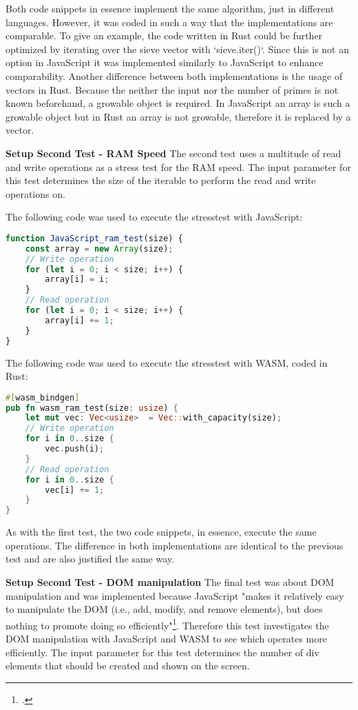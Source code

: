 Both code snippets in essence implement the same algorithm, just in different languages. However, it was coded in such a way that the implementations are comparable. To give an example, the code written in Rust could be further optimized by iterating over the sieve vector with `sieve.iter()`. Since this is not an option in JavaScript it was implemented similarly to JavaScript to enhance comparability. Another difference between both implementations is the usage of vectors in Rust. Because the neither the input nor the number of primes is not known beforehand, a growable object is required. In JavaScript an array is such a growable object but in Rust an array is not growable, therefore it is replaced by a vector. 

\textbf{Setup Second Test - RAM Speed} \newline
The second test uses a multitude of read and write operations as a stress test for the RAM speed. The input parameter for this test determines the size of the iterable to perform the read and write operations on.

The following code was used to execute the stresstest with JavaScript:
\begin{lstlisting}[language=JavaScript, caption={RAM stresstest in JavaScript, source: self-coded}]
function JavaScript_ram_test(size) {
    const array = new Array(size);
    // Write operation
    for (let i = 0; i < size; i++) {
        array[i] = i;
    }
    // Read operation
    for (let i = 0; i < size; i++) {
        array[i] += 1;
    }
}
\end{lstlisting}

The following code was used to execute the stresstest with WASM, coded in Rust:
\begin{lstlisting}[language=Rust, caption={RAM stresstest in Rust, source: self-coded}]
#[wasm_bindgen]
pub fn wasm_ram_test(size: usize) {
    let mut vec: Vec<usize>  = Vec::with_capacity(size);
    // Write operation
    for i in 0..size {
        vec.push(i);
    }
    // Read operation
    for i in 0..size {
        vec[i] += 1;
    }
}
\end{lstlisting}

As with the first test, the two code snippets, in essence, execute the same operations. The difference in both implementations are identical to the previous test and are also justified the same way. 

\textbf{Setup Second Test - DOM manipulation} \newline
The final test was about DOM manipulation and was implemented because JavaScript "makes it relatively easy to manipulate the DOM (i.e., add, modify, and remove elements), but does nothing to promote doing so efficiently"\footcite{peterson_10_nodate}. Therefore this test investigates the DOM manipulation with JavaScript and WASM to see which operates more efficiently. The input parameter for this test determines the number of div elements that should be created and shown on the screen.

